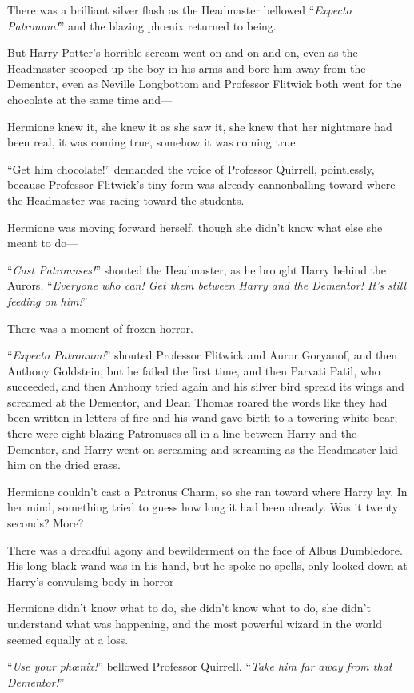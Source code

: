 There was a brilliant silver flash as the Headmaster bellowed “\emph{Expecto Patronum!}” and the blazing phœnix returned to being.

But Harry Potter’s horrible scream went on and on and on, even as the Headmaster scooped up the boy in his arms and bore him away from the Dementor, even as Neville Longbottom and Professor Flitwick both went for the chocolate at the same time and—

Hermione knew it, she knew it as she saw it, she knew that her nightmare had been real, it was coming true, somehow it was coming true.

“Get him chocolate!” demanded the voice of Professor Quirrell, pointlessly, because Professor Flitwick’s tiny form was already cannonballing toward where the Headmaster was racing toward the students.

Hermione was moving forward herself, though she didn’t know what else she meant to do—

“\emph{Cast Patronuses!}” shouted the Headmaster, as he brought Harry behind the Aurors. “\emph{Everyone who can! Get them between Harry and the Dementor! It’s still feeding on him!}”

There was a moment of frozen horror.

“\emph{Expecto Patronum!}” shouted Professor Flitwick and Auror Goryanof, and then Anthony Goldstein, but he failed the first time, and then Parvati Patil, who succeeded, and then Anthony tried again and his silver bird spread its wings and screamed at the Dementor, and Dean Thomas roared the words like they had been written in letters of fire and his wand gave birth to a towering white bear; there were eight blazing Patronuses all in a line between Harry and the Dementor, and Harry went on screaming and screaming as the Headmaster laid him on the dried grass.

Hermione couldn’t cast a Patronus Charm, so she ran toward where Harry lay. In her mind, something tried to guess how long it had been already. Was it twenty seconds? More?

There was a dreadful agony and bewilderment on the face of Albus Dumbledore. His long black wand was in his hand, but he spoke no spells, only looked down at Harry’s convulsing body in horror—

Hermione didn’t know what to do, she didn’t know what to do, she didn’t understand what was happening, and the most powerful wizard in the world seemed equally at a loss.

“\emph{Use your phœnix!}” bellowed Professor Quirrell. “\emph{Take him far away from that Dementor!}”

